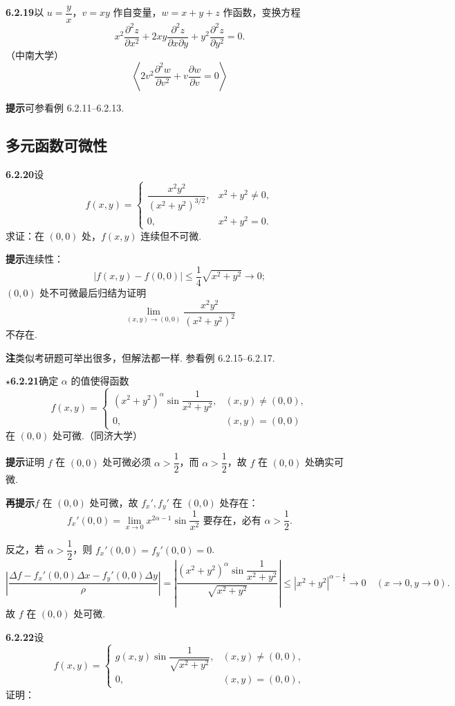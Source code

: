 \documentclass[UTF8,12pt,a4paper,fontset=fandol]{ctexart}
\begin{document}
\noindent\textbf{6.2.19}\quad 以 $u=\dfrac yx$，$v=xy$ 作自变量，$w=x+y+z$ 作函数，变换方程
\[
  x^2\frac{\partial^2z}{\partial x^2}
  +2xy\frac{\partial^2z}{\partial x\partial y}
  +y^2\frac{\partial^2z}{\partial y^2}=0.
\]
（中南大学）
\[
  \left\langle 2v^2\frac{\partial^2w}{\partial v^2}+v\frac{\partial w}{\partial v}=0\right\rangle
\]

\noindent\textbf{提示}\quad 可参看例 6.2.11--6.2.13.

\subsection*{多元函数可微性}

\noindent\textbf{6.2.20}\quad 设
\[
  f(x,y)=
  \begin{cases}
  \dfrac{x^2y^2}{(x^2+y^2)^{3/2}}, & x^2+y^2\ne0,\\
  0, & x^2+y^2=0.
  \end{cases}
\]
求证：在 $(0,0)$ 处，$f(x,y)$ 连续但不可微.

\noindent\textbf{提示}\quad 连续性：
\[
  |f(x,y)-f(0,0)|\le\frac14\sqrt{x^2+y^2}\to0;
\]
$(0,0)$ 处不可微最后归结为证明
\[
  \lim_{(x,y)\to(0,0)}\frac{x^2y^2}{(x^2+y^2)^2}
\]
不存在.

\noindent\textbf{注}\quad 类似考研题可举出很多，但解法都一样. 参看例 6.2.15--6.2.17.

\noindent\textbf{\ensuremath{\star}6.2.21}\quad 确定 $\alpha$ 的值使得函数
\[
  f(x,y)=
  \begin{cases}
  (x^2+y^2)^\alpha\sin\dfrac1{x^2+y^2}, & (x,y)\ne(0,0),\\
  0, & (x,y)=(0,0)
  \end{cases}
\]
在 $(0,0)$ 处可微.（同济大学）

\noindent\textbf{提示}\quad 证明 $f$ 在 $(0,0)$ 处可微必须 $\alpha>\dfrac12$，而 $\alpha>\dfrac12$，故 $f$ 在 $(0,0)$ 处确实可微.

\noindent\textbf{再提示}\quad $f$ 在 $(0,0)$ 处可微，故 $f_x',f_y'$ 在 $(0,0)$ 处存在：
\[
  f_x'(0,0)=\lim_{x\to0}x^{2\alpha-1}\sin\frac1{x^2}\text{ 要存在，必有 }\alpha>\frac12.
\]

\noindent 反之，若 $\alpha>\dfrac12$，则 $f_x'(0,0)=f_y'(0,0)=0$.
\[
  \left|
  \frac{\Delta f-f_x'(0,0)\Delta x-f_y'(0,0)\Delta y}{\rho}
  \right|
  =
  \left|
  \frac{(x^2+y^2)^\alpha\sin\dfrac1{x^2+y^2}}{\sqrt{x^2+y^2}}
  \right|
  \le |x^2+y^2|^{\alpha-\frac12}\to0\quad(x\to0,y\to0).
\]
故 $f$ 在 $(0,0)$ 处可微.

\noindent\textbf{6.2.22}\quad 设
\[
  f(x,y)=
  \begin{cases}
  g(x,y)\sin\dfrac1{\sqrt{x^2+y^2}}, & (x,y)\ne(0,0),\\
  0, & (x,y)=(0,0),
  \end{cases}
\]
证明：
\end{document}
